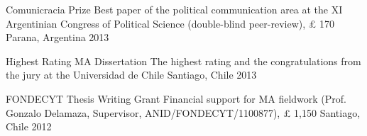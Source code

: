 \begin{cvhonors}
\cvhonor
{Comunicracia Prize}
{Best paper of the political communication area at the XI Argentinian Congress of Political Science (double-blind peer-review), {\pounds} 170}
{Parana, Argentina}
{2013}
\end{cvhonors}

\vspace{1mm}

\begin{cvhonors}
\cvhonor
{Highest Rating MA Dissertation}
{The highest rating and the congratulations from the jury at the Universidad de Chile}
{Santiago, Chile}
{2013}
\end{cvhonors}

\vspace{1mm}

\begin{cvhonors}
\cvhonor
{FONDECYT Thesis Writing Grant}
{Financial support for MA fieldwork (Prof. Gonzalo Delamaza, Supervisor, ANID/FONDECYT/1100877), {\pounds} 1,150}
{Santiago, Chile}
{2012}
\end{cvhonors}

\vspace{1mm}
